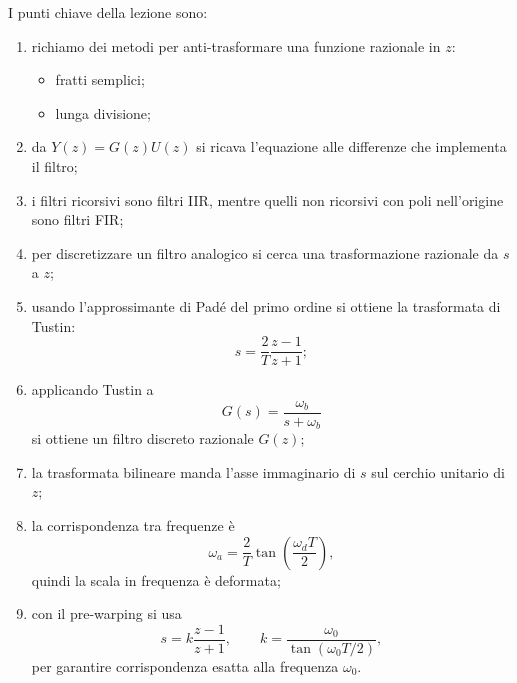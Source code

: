 I punti chiave della lezione sono:
\begin{enumerate}
    \item richiamo dei metodi per anti-trasformare una funzione razionale in \(z\):
    \begin{itemize}
        \item fratti semplici;
        \item lunga divisione;
    \end{itemize}
    \item da \(Y(z)=G(z)U(z)\) si ricava l'equazione alle differenze che implementa il filtro;
    \item i filtri ricorsivi sono filtri IIR, mentre quelli non ricorsivi con poli nell'origine
    sono filtri FIR;
    \item per discretizzare un filtro analogico si cerca una trasformazione razionale da \(s\) a \(z\);
    \item usando l'approssimante di Pad\'e del primo ordine si ottiene la trasformata di Tustin:
    \[
    s=\frac{2}{T}\frac{z-1}{z+1};
    \]
    \item applicando Tustin a
    \[
    G(s)=\frac{\omega_b}{s+\omega_b}
    \]
    si ottiene un filtro discreto razionale \(G(z)\);
    \item la trasformata bilineare manda l'asse immaginario di \(s\) sul cerchio unitario di \(z\);
    \item la corrispondenza tra frequenze \`e
    \[
    \omega_a=\frac{2}{T}\tan\!\left(\frac{\omega_d T}{2}\right),
    \]
    quindi la scala in frequenza \`e deformata;
    \item con il pre-warping si usa
    \[
    s=k\frac{z-1}{z+1},
    \qquad
    k=\frac{\omega_0}{\tan(\omega_0 T/2)},
    \]
    per garantire corrispondenza esatta alla frequenza \(\omega_0\).
\end{enumerate}